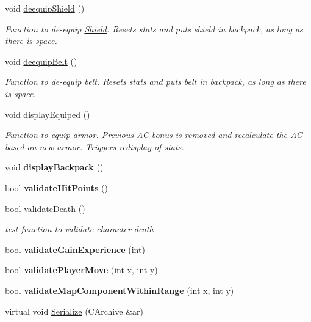 \begin{DoxyCompactItemize}
\hypertarget{class_fighter_a313e661908412be41e7f3f67c3c050f4}{}\label{class_fighter_a313e661908412be41e7f3f67c3c050f4} 
void \hyperlink{class_fighter_a313e661908412be41e7f3f67c3c050f4}{deequip\+Shield} ()
\begin{DoxyCompactList}\small\item\em Function to de-\/equip \hyperlink{class_shield}{Shield}. Resets stats and puts shield in backpack, as long as there is space. \end{DoxyCompactList}\item 
\hypertarget{class_fighter_a529fdd57ee79c761a7601356f861d7fb}{}\label{class_fighter_a529fdd57ee79c761a7601356f861d7fb} 
void \hyperlink{class_fighter_a529fdd57ee79c761a7601356f861d7fb}{deequip\+Belt} ()
\begin{DoxyCompactList}\small\item\em Function to de-\/equip belt. Resets stats and puts belt in backpack, as long as there is space. \end{DoxyCompactList}\item 
\hypertarget{class_fighter_a30734efb2140029276fd7528d28685fc}{}\label{class_fighter_a30734efb2140029276fd7528d28685fc} 
void \hyperlink{class_fighter_a30734efb2140029276fd7528d28685fc}{display\+Equiped} ()
\begin{DoxyCompactList}\small\item\em Function to equip armor. Previous AC bonus is removed and recalculate the AC based on new armor. Triggers redisplay of stats. \end{DoxyCompactList}\item 
\hypertarget{class_fighter_a1f026b1314d058a8033a19328a40e4cb}{}\label{class_fighter_a1f026b1314d058a8033a19328a40e4cb} 
void {\bfseries display\+Backpack} ()
\item 
\hypertarget{class_fighter_a235df759d42bb20bd6314abe806dd6ce}{}\label{class_fighter_a235df759d42bb20bd6314abe806dd6ce} 
bool {\bfseries validate\+Hit\+Points} ()
\item 
\hypertarget{class_fighter_a7372ff74df453241ee2d990a265fd71c}{}\label{class_fighter_a7372ff74df453241ee2d990a265fd71c} 
bool \hyperlink{class_fighter_a7372ff74df453241ee2d990a265fd71c}{validate\+Death} ()
\begin{DoxyCompactList}\small\item\em test function to validate character death \end{DoxyCompactList}\item 
\hypertarget{class_fighter_a05f927eea7af56811cce5a8ba2c8a349}{}\label{class_fighter_a05f927eea7af56811cce5a8ba2c8a349} 
bool {\bfseries validate\+Gain\+Experience} (int)
\item 
\hypertarget{class_fighter_ab2a750803d7df7f1d66e9b40074f7a41}{}\label{class_fighter_ab2a750803d7df7f1d66e9b40074f7a41} 
bool {\bfseries validate\+Player\+Move} (int x, int y)
\item 
\hypertarget{class_fighter_a66d147cbc9c3690009cad90a6ee35f42}{}\label{class_fighter_a66d147cbc9c3690009cad90a6ee35f42} 
bool {\bfseries validate\+Map\+Component\+Within\+Range} (int x, int y)
\item 
virtual void \hyperlink{class_fighter_a44b8e8e71e55b645c4fe7f67ef844e87}{Serialize} (C\+Archive \&ar)
\end{DoxyCompactItemize}
